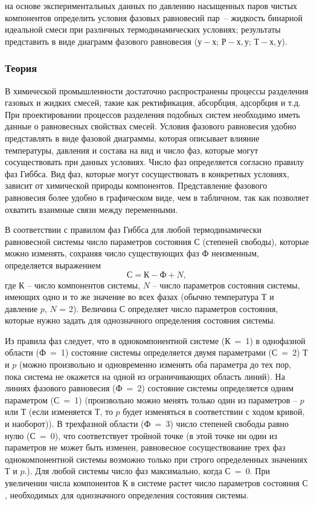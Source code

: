 
\goal на основе экспериментальных данных по давлению насыщенных паров чистых компонентов определить условия фазовых равновесий пар~-- жидкость бинарной идеальной смеси при различных термодинамических условиях; результаты представить в виде диаграмм фазового равновесия ($у-х$; $Р-х, у$; $Т-х, у$).

\subsubsection{Теория}

В химической промышленности достаточно распространены процессы разделения газовых и жидких смесей, такие как ректификация, абсорбция, адсорбция и т.д. При проектировании процессов разделения подобных систем необходимо иметь данные о равновесных свойствах смесей. Условия фазового равновесия удобно представлять в виде фазовой диаграммы, которая описывает влияние температуры, давления и состава на вид и число фаз, которые могут сосуществовать при данных условиях. Число фаз определяется согласно правилу фаз Гиббса. Вид фаз, которые могут сосуществовать в конкретных условиях, зависит от химической природы компонентов. Представление фазового равновесия более удобно в графическом виде, чем в табличном, так как позволяет охватить взаимные связи между переменными.

В соответствии с правилом фаз Гиббса для любой термодинамически равновесной системы число параметров состояния $С$ (степеней свободы), которые можно изменять, сохраняя число существующих фаз $Ф$ неизменным, определяется выражением
\begin{equation}
С=К-Ф+N,
\end{equation}
где $К$ – число компонентов системы, $N$ – число параметров состояния системы, имеющих одно и то же значение во всех фазах (обычно температура $Т$ и давление $p$, $N$ = 2). Величина $С$ определяет число параметров состояния, которые нужно задать для однозначного определения состояния системы.

Из правила фаз следует, что в однокомпонентной системе ($К$ = 1) в однофазной области ($Ф$ = 1) состояние системы определяется двумя параметрами ($С$ = 2) $Т$ и $p$ (можно произвольно и одновременно изменять оба параметра до тех пор, пока система не окажется на одной из ограничивающих область линий). На линиях фазового равновесия ($Ф$ = 2) состояние системы определяется одним параметром ($С$ = 1) (произвольно можно менять только один из параметров – $p$ или $Т$ (если изменяется $Т$, то $p$ будет изменяться в соответствии с ходом кривой, и наоборот)). В трехфазной области ($Ф$ = 3) число степеней свободы равно нулю ($С$ = 0), что соответствует тройной точке (в этой точке ни один из параметров не может быть изменен, равновесное сосуществование трех фаз однокомпонентной системы возможно только при строго определенных значениях $Т$ и $p$.). Для любой системы число фаз максимально, когда $С$ = 0. При увеличении числа компонентов $К$ в системе растет число параметров состояния $С$, необходимых для однозначного определения состояния системы.

